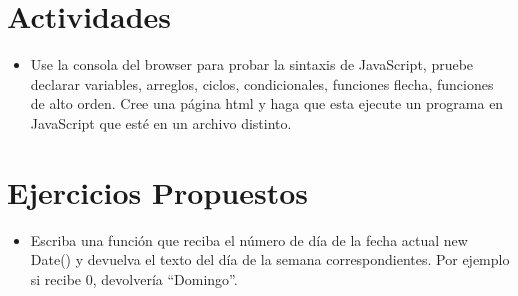 \documentclass{article}
\begin{document}
	\section{Actividades}
	\begin{itemize}		
		\item Use la consola del browser para probar la sintaxis de JavaScript, pruebe declarar variables, arreglos, ciclos, condicionales, funciones flecha, funciones de alto orden.
		Cree una página  html y haga que esta ejecute un programa en JavaScript que esté en un archivo distinto.
	\end{itemize}
	\section{Ejercicios Propuestos}
	\begin{itemize}		
		\item Escriba una función que reciba el número de día de la fecha actual new Date()  y devuelva el texto del día de la semana correspondientes. Por ejemplo si recibe 0, devolvería “Domingo”.
		

\end{itemize}
\end{document}
